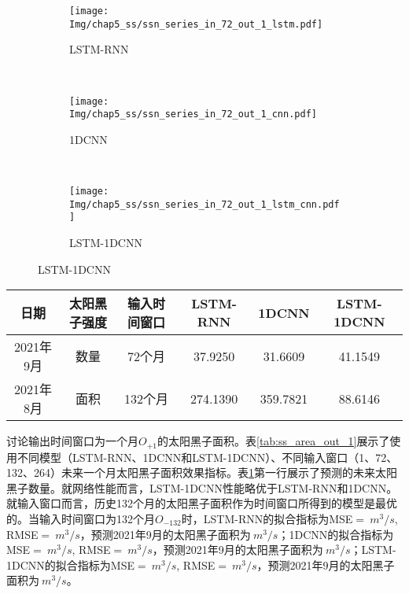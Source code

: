 \begin{figure}[!htbp]
  \centering
  \begin{subfigure}[b]{1.0\textwidth}
    \caption{LSTM-RNN} 
    \vspace{-0.35cm}
    \texttt{[image: Img/chap5\_ss/ssn\_series\_in\_72\_out\_1\_lstm.pdf]}
    \label{fig:ssn_series_in_72_out_1_lstm}
  \end{subfigure}    \\
  \vspace{-1cm}
  \begin{subfigure}[b]{1.0\textwidth}
    \caption{1DCNN}
    \vspace{-0.35cm}
    \texttt{[image: Img/chap5\_ss/ssn\_series\_in\_72\_out\_1\_cnn.pdf]}
    \label{fig:ssn_series_in_72_out_1_cnn}
  \end{subfigure} \\
  \vspace{-1cm}
  \begin{subfigure}[b]{1.0\textwidth}
    \caption{LSTM-1DCNN}
    \vspace{-0.35cm}
    \texttt{[image: Img/chap5\_ss/ssn\_series\_in\_72\_out\_1\_lstm\_cnn.pdf]}
    \label{fig:ssn_series_in_72_out_1_lstm_cnn}
    \end{subfigure}
  \vspace{-2cm}
  \label{fig:ssn_series_in_72_out_1}
\end{figure}

\begin{table}[!htbp]
  \centering
  \label{tab:ss_out_1}
  \footnotesize
  \begin{tabular}{cccccc}
    \toprule
    日期 & 太阳黑子强度 & 输入时间窗口 & LSTM-RNN & 1DCNN & LSTM-1DCNN  \\
    \midrule
    2021年9月 & 数量 & 72个月 & 37.9250 & 31.6609 & 41.1549 \\
    2021年8月 & 面积 & 132个月 & 274.1390 & 359.7821 & 88.6146 \\
    \bottomrule
\end{tabular}
\end{table}

讨论输出时间窗口为一个月$O_{+1}$的太阳黑子面积。表\ref{tab:ss_area_out_1}展示了使用不同模型（LSTM-RNN、1DCNN和LSTM-1DCNN）、不同输入窗口（1、72、132、264）未来一个月太阳黑子面积效果指标。表\ref{tab:ss_out_1}第一行展示了预测的未来太阳黑子数量。就网络性能而言，LSTM-1DCNN性能略优于LSTM-RNN和1DCNN。就输入窗口而言，历史132个月的太阳黑子面积作为时间窗口所得到的模型是最优的。当输入时间窗口为132个月$O_{-132}$时，LSTM-RNN的拟合指标为MSE$=\SI{}{m^{3}/s}$, RMSE$=\SI{}{m^{3}/s}$，预测2021年9月的太阳黑子面积为$\SI{}{m^{3}/s}$；1DCNN的拟合指标为MSE$=\SI{}{m^{3}/s}$, RMSE$=\SI{}{m^{3}/s}$，预测2021年9月的太阳黑子面积为$\SI{}{m^{3}/s}$；LSTM-1DCNN的拟合指标为MSE$=\SI{}{m^{3}/s}$, RMSE$=\SI{}{m^{3}/s}$，预测2021年9月的太阳黑子面积为$\SI{}{m^{3}/s}$。

